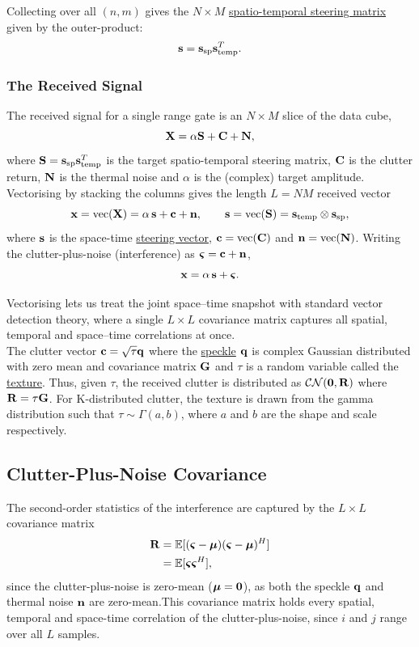 \documentclass{article}
\begin{document}
Collecting over all $(n, m)$ gives the $N\times M$ \underline{spatio-temporal steering matrix} given by the outer-product: $$\vb s = \vb s_\text{sp} \vb s_\text{temp}^T.$$

\subsubsection{The Received Signal}
The received signal for a single range gate is an $N\times M$ slice of the data cube, $$\mathbf{X} = \alpha\mathbf{S} + \mathbf{C} + \mathbf{N},$$ where $\mathbf{S}=\vb s_\text{sp}\vb s_\text{temp}^T$ is the target spatio-temporal steering matrix, $\mathbf{C}$ is the clutter return, $\mathbf{N}$ is the thermal noise and $\alpha$ is the (complex) target amplitude.\\

Vectorising by stacking the columns gives the length $L=NM$ received vector $$\vb x = \operatorname{vec}(\vb X) = \alpha\,\vb s + \vb c + \vb n,\qquad \vb s = \operatorname{vec}(\vb S) = \vb s_\text{temp}\otimes\vb s_\text{sp},$$ where $\vb s$ is the space-time \underline{steering vector}, $\vb c = \operatorname{vec}(\mathbf{C})$ and $\vb n = \operatorname{vec}(\mathbf{N})$. Writing the clutter-plus-noise (interference) as $\boldsymbol{\varsigma}=\vb c+\vb n$, $$\vb x = \alpha\,\vb s + \boldsymbol{\varsigma}.$$

Vectorising lets us treat the joint space--time snapshot with standard vector
detection theory, where a single $L\times L$ covariance matrix captures all spatial,
temporal and space--time correlations at once.\\

The clutter vector $\vb c = \sqrt{\tau} \vb q$ where the \underline{speckle} $\vb q$ is complex Gaussian distributed with zero mean and covariance matrix $\mathbf{G}$ and $\tau$ is a random variable called the \underline{texture}. Thus, given $\tau$, the received clutter is distributed as $\mathcal{CN}(\vb 0, \mathbf{R})$ where $\mathbf{R} = \tau \mathbf{G}$. For K-distributed clutter, the texture is drawn from the gamma distribution such that $\tau\sim\Gamma(a, b)$, where $a$ and $b$ are the shape and scale respectively.

\subsection{Clutter-Plus-Noise Covariance}
The second-order statistics of the interference are captured by the $L\times L$
covariance matrix \begin{align}
    \mathbf{R} &= \mathbb{E}[(\boldsymbol{\varsigma}-\boldsymbol{\mu})(\boldsymbol{\varsigma}-\boldsymbol{\mu})^H] \nonumber\\
         &= \mathbb{E}[\boldsymbol{\varsigma}\boldsymbol{\varsigma}^H], \nonumber
\end{align} 
since the clutter-plus-noise is zero-mean ($\boldsymbol{\mu}=\vb 0$), as both the speckle $\vb q$ and thermal noise $\vb n$ are zero-mean.This covariance matrix holds every spatial, temporal and space-time correlation of the clutter-plus-noise, since $i$ and $j$ range over all $L$ samples. \\
\end{document}
